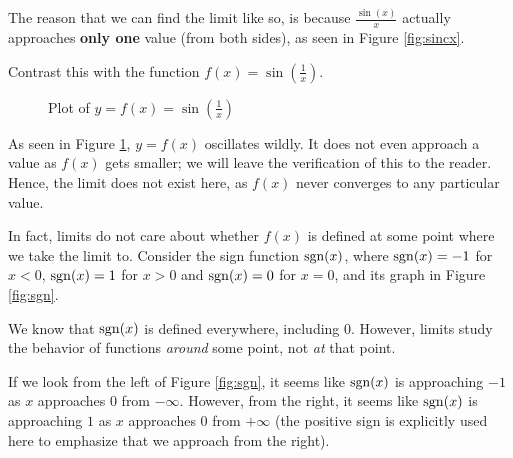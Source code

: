 The reason that we can find the limit like so, is because $\frac{\sin(x)}{x}$ actually approaches
\textbf{only one} value (from both sides), as seen in Figure \ref{fig:sincx}.

Contrast this with the function $f(x) = \sin\left(\frac{1}{x}\right)$.

\begin{figure}[h]
    \centering
    \caption{Plot of $y = f(x) = \sin\left(\frac{1}{x}\right)$}
    \label{fig:sinrx}
\end{figure}

As seen in Figure \ref{fig:sinrx}, $y = f(x)$ oscillates wildly. It does not even approach a value as $f(x)$ gets smaller; we will leave
the verification of this to the reader. Hence, the limit does not exist here, as $f(x)$ never converges to any
particular value.

In fact, limits do not care about whether $f(x)$ is defined at some point where we
take the limit to. Consider the sign function $\operatorname{sgn}(x)$, where
$\operatorname{sgn}(x) = -1$ for $x < 0$, $\operatorname{sgn}(x) = 1$ for $x > 0$ and $\operatorname{sgn}(x) = 0$ for $x = 0$, and its
graph in Figure \ref{fig:sgn}.

We know that $\operatorname{sgn}(x)$ is defined everywhere, including $0$. However, limits study the behavior of
functions \textit{around} some point, not \textit{at} that point.

If we look from the left of Figure \ref{fig:sgn}, it seems like $\operatorname{sgn}(x)$ is approaching $-1$ as $x$ approaches $0$ from
$-\infty$. However, from the right, it seems like $\operatorname{sgn}(x)$ is approaching $1$ as $x$ approaches $0$
from $+\infty$ (the positive sign is explicitly used here to emphasize that we approach from the right).

